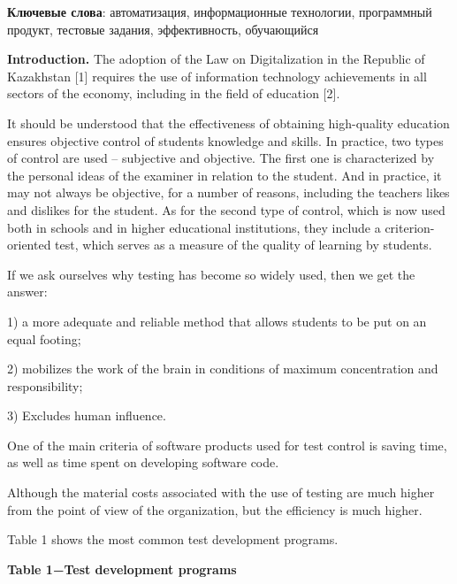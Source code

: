 {\bfseries Ключевые слова}: автоматизация, информационные технологии,
программный продукт, тестовые задания, эффективность, обучающийся

\begin{multicols}{2}

{\bfseries Introduction.} The adoption of the Law on Digitalization in the
Republic of Kazakhstan {[}1{]} requires the use of information
technology achievements in all sectors of the economy, including in the
field of education {[}2{]}.

It should be understood that the effectiveness of obtaining high-quality
education ensures objective control of students\textquotesingle{}
knowledge and skills. In practice, two types of control are used --
subjective and objective. The first one is characterized by the personal
ideas of the examiner in relation to the student. And in practice, it
may not always be objective, for a number of reasons, including the
teacher\textquotesingle s likes and dislikes for the student. As for the
second type of control, which is now used both in schools and in higher
educational institutions, they include a criterion-oriented test, which
serves as a measure of the quality of learning by students.

If we ask ourselves why testing has become so widely used, then we get
the answer:

1) a more adequate and reliable method that allows students to be put on
an equal footing;

2) mobilizes the work of the brain in conditions of maximum
concentration and responsibility;

3) Excludes human influence.

One of the main criteria of software products used for test control is
saving time, as well as time spent on developing software code.

Although the material costs associated with the use of testing are much
higher from the point of view of the organization, but the efficiency is
much higher.


Table 1 shows the most common test development programs.
\end{multicols}


{\bfseries Table 1−Test development programs}

